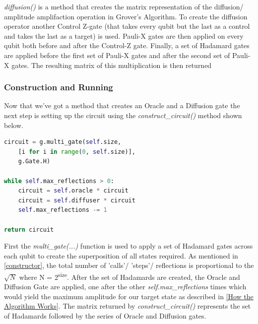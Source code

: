 \documentclass{article}
\begin{document}
\textit{diffusion()} is a method that creates the matrix  representation  of the diffusion/ amplitude amplifaction operation in Grover's Algorithm. To create the diffusion operator another Control Z-gate (that takes every qubit but the last as a control and takes the last as a target) is used. Pauli-X gates are then applied on every qubit both before and after the Control-Z gate. Finally, a set of Hadamard gates are applied before the first set of Pauli-X gates and after the second set of Pauli-X gates. The resulting matrix of this multiplication is then returned
 
\subsubsection{Construction and Running}

Now that we've got a method that creates an Oracle and a Diffusion gate the next step is setting up the circuit using the \textit{construct\_circuit()} method shown below.

\begin{file}
\begin{lstlisting}[language=Python]
circuit = g.multi_gate(self.size, 
	[i for i in range(0, self.size)],
	g.Gate.H)

while self.max_reflections > 0:
	circuit = self.oracle * circuit
	circuit = self.diffuser * circuit
	self.max_reflections -= 1
	
return circuit

\end{lstlisting}
\end{file}

First the \textit{multi\_gate(...)} function is used to apply a set of Hadamard gates across each qubit to create the superposition of all states required. As mentioned in \ref{constructor}, the total number of 'calls'/ 'steps'/ reflections is proportional to the $\sqrt{N}$ where N = 2\textsuperscript{size}. After the set of Hadamards are created, the Oracle and Diffusion Gate are applied, one after the other \textit{self.max\_reflections} times which would yield the maximum amplitude for our target state as described in \ref{How the Algorithm Works}. The matrix returned by \textit{construct\_circuit()} represents the set of Hadamards followed by the series of Oracle and Diffusion gates.
\end{document}
